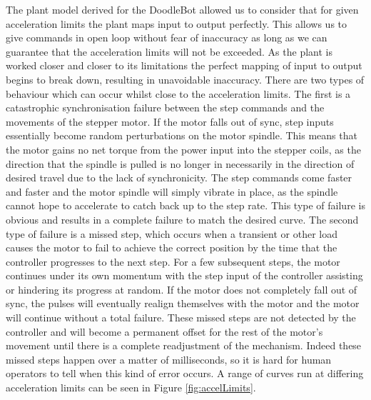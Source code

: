 The plant model derived for the DoodleBot allowed us to consider that for given acceleration limits the plant maps input to output perfectly. This allows us to give commands in open loop without fear of inaccuracy as long as we can guarantee that the acceleration limits will not be exceeded. As the plant is worked closer and closer to its limitations the perfect mapping of input to output begins to break down, resulting in unavoidable inaccuracy. There are two types of behaviour which can occur whilst close to the acceleration limits. The first is a catastrophic synchronisation failure between the step commands and the movements of the stepper motor. If the motor falls out of sync, step inputs essentially become random perturbations on the motor spindle. This means that the motor gains no net torque from the power input into the stepper coils, as the direction that the spindle is pulled is no longer in necessarily in the direction of desired travel due to the lack of synchronicity. The step commands come faster and faster and the motor spindle will simply vibrate in place, as the spindle cannot hope to accelerate to catch back up to the step rate. This type of failure is obvious and results in a complete failure to match the desired curve.
The second type of failure is a missed step, which occurs when a transient or other load causes the motor to fail to achieve the correct position by the time that the controller progresses to the next step. For a few subsequent steps, the motor continues under its own momentum with the step input of the controller assisting or hindering its progress at random. If the motor does not completely fall out of sync, the pulses will eventually realign themselves with the motor and the motor will continue without a total failure. These missed steps are not detected by the controller and will become a permanent offset for the rest of the motor's movement until there is a complete readjustment of the mechanism. Indeed these missed steps happen over a matter of milliseconds, so it is hard for human operators to tell when this kind of error occurs.
A range of curves run at differing acceleration limits can be seen in Figure \ref{fig:accelLimits}.
	
